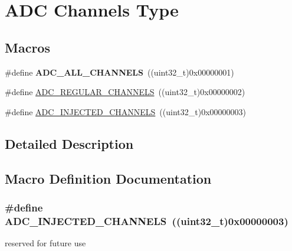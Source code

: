 \hypertarget{group___a_d_c__channels__type}{}\section{A\+DC Channels Type}
\label{group___a_d_c__channels__type}
\subsection*{Macros}
\begin{DoxyCompactItemize}
\item 
\#define {\bfseries A\+D\+C\+\_\+\+A\+L\+L\+\_\+\+C\+H\+A\+N\+N\+E\+LS}~((uint32\+\_\+t)0x00000001)\hypertarget{group___a_d_c__channels__type_ga06d28ef2d0b9e110f69a35e4793f066e}{}\label{group___a_d_c__channels__type_ga06d28ef2d0b9e110f69a35e4793f066e}

\item 
\#define \hyperlink{group___a_d_c__channels__type_gad47a927eded315f3dcb21df51ff778fd}{A\+D\+C\+\_\+\+R\+E\+G\+U\+L\+A\+R\+\_\+\+C\+H\+A\+N\+N\+E\+LS}~((uint32\+\_\+t)0x00000002)
\item 
\#define \hyperlink{group___a_d_c__channels__type_ga6444b1539e8503ef3a2496ccf7eeb9fd}{A\+D\+C\+\_\+\+I\+N\+J\+E\+C\+T\+E\+D\+\_\+\+C\+H\+A\+N\+N\+E\+LS}~((uint32\+\_\+t)0x00000003)
\end{DoxyCompactItemize}


\subsection{Detailed Description}


\subsection{Macro Definition Documentation}
\subsubsection[{\texorpdfstring{A\+D\+C\+\_\+\+I\+N\+J\+E\+C\+T\+E\+D\+\_\+\+C\+H\+A\+N\+N\+E\+LS}{ADC_INJECTED_CHANNELS}}]{\setlength{\rightskip}{0pt plus 5cm}\#define A\+D\+C\+\_\+\+I\+N\+J\+E\+C\+T\+E\+D\+\_\+\+C\+H\+A\+N\+N\+E\+LS~((uint32\+\_\+t)0x00000003)}\hypertarget{group___a_d_c__channels__type_ga6444b1539e8503ef3a2496ccf7eeb9fd}{}\label{group___a_d_c__channels__type_ga6444b1539e8503ef3a2496ccf7eeb9fd}
reserved for future use 
